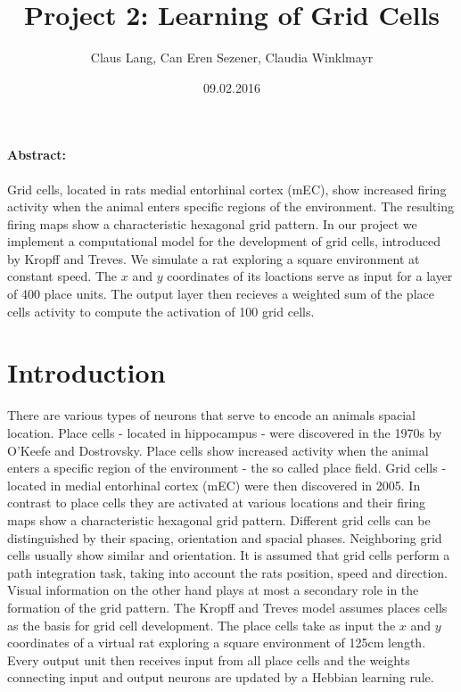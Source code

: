 \documentclass[a4paper, 12pt]{article}
\title{Project 2: Learning of Grid Cells}
\author{Claus Lang, Can Eren Sezener, Claudia Winklmayr}
\date{09.02.2016}
\begin{document}
\maketitle

\paragraph{Abstract:}
Grid cells, located in rats medial entorhinal cortex (mEC), show increased firing activity when the animal enters specific regions of the environment. The resulting firing maps show a characteristic hexagonal grid pattern. In our project we implement a computational model for the development of grid cells, introduced by Kropff and Treves. We simulate a rat exploring a square environment at constant speed. The $x$ and $y$ coordinates of its loactions serve as input for a layer of 400 place units. The output layer then recieves a weighted sum of the place cells activity to compute the activation of 100 grid cells.
 

\section{Introduction}
There are various types of neurons that serve to encode an animals spacial location. Place cells - located in hippocampus - were discovered in the 1970s by O'Keefe and Dostrovsky. Place cells show increased activity when the animal enters a specific region of the environment - the so called place field.\newline
Grid cells - located in medial entorhinal cortex (mEC) were then discovered in 2005. In contrast to place cells they are activated at various locations and their firing maps show a characteristic hexagonal grid pattern. Different grid cells can be distinguished by their spacing, orientation and spacial phases. Neighboring grid cells usually show similar and orientation. \newline
It is assumed that grid cells perform a path integration task, taking into account the rats position, speed and direction. Visual information on the other hand plays at most a secondary role in the formation of the grid pattern. \newline
The Kropff and Treves model assumes places cells as the basis for grid cell development. The place cells take as input the $x$ and $y$ coordinates of a virtual rat exploring a square environment of 125cm length. Every output unit then receives input from all place cells and the weights connecting input and output neurons are updated by a Hebbian learning rule. 
%
%
%
\end{document}
